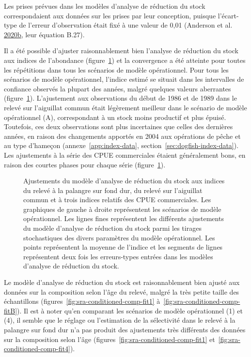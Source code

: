 \documentclass[11pt]{book}
\begin{document}
Les prises prévues dans les modèles d'analyse de réduction du stock correspondaient aux données sur les prises par leur conception, puisque l'écart-type de l'erreur d'observation était fixé à une valeur de 0,01 (Anderson et al. \protect\hyperlink{ref-anderson2020gfmp}{2020}\protect\hyperlink{ref-anderson2020gfmp}{b}, leur équation B.27).

Il a été possible d'ajuster raisonnablement bien l'analyse de réduction du stock aux indices de l'abondance (figure~\ref{fig:survey-fits}) et la convergence a été atteinte pour toutes les répétitions dans tous les scénarios de modèle opérationnel. Pour tous les scénarios de modèle opérationnel, l'indice estimé se situait dans les intervalles de confiance observés la plupart des années, malgré quelques valeurs aberrantes (figure~\ref{fig:survey-fits}). L'ajustement aux observations du début de 1986 et de 1989 dans le relevé sur l'aiguillat commun était légèrement meilleur dans le scénario de modèle opérationnel (A), correspondant à un stock moins productif et plus épuisé. Toutefois, ces deux observations sont plus incertaines que celles des dernières années, en raison des changements apportés en 2004 aux opérations de pêche et au type d'hameçon (annexe~\ref{app:index-data}, section~\ref{sec:dogfish-index-data}). Les ajustements à la série des CPUE commerciales étaient généralement bons, en raison des courtes phases pour chaque série (figure~\ref{fig:survey-fits}).


\begin{figure}[htb]

{\centering {} 

}

\caption{Ajustements du modèle d'analyse de réduction du stock aux indices du relevé à la palangre sur fond dur, du relevé sur l'aiguillat commun et à trois indices relatifs des CPUE commerciales. Les graphiques de gauche à droite représentent les scénarios de modèle opérationnel. Les lignes fines représentent les différents ajustements du modèle d'analyse de réduction du stock parmi les tirages stochastiques des divers paramètres du modèle opérationnel. Les points représentent la moyenne de l'indice et les segments de lignes représentent deux fois les erreurs-types entrées dans les modèles d'analyse de réduction du stock.}\label{fig:survey-fits}
\end{figure}
Le modèle d'analyse de réduction du stock est raisonnablement bien ajusté aux données sur la composition selon l'âge du relevé, malgré la très petite taille des échantillons (figures~\ref{fig:sra-conditioned-comp-fit1} à~\ref{fig:sra-conditioned-comp-fitB}). Il est à noter qu'en comparant les scénarios de modèle opérationnel (1) et (4), il semble que le réglage ou l'estimation de la sélectivité dans le relevé à la palangre sur fond dur n'a pas produit des ajustements très différents des données sur la composition selon l'âge (figures~\ref{fig:sra-conditioned-comp-fit1} et~\ref{fig:sra-conditioned-comp-fit4}).
\end{document}
